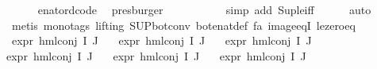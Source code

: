 \begin{isabellebody}
\ \ \ \ \isamarkupfalse%
\ enat{\isacharunderscore}{\kern0pt}ord{\isacharunderscore}{\kern0pt}code{\isacharparenleft}{\kern0pt}{}{\isacharparenright}{\kern0pt}\ \isamarkupfalse%
\ presburger\isanewline
\ \ \ \ \ \ \ \ \ \isamarkupfalse%
\ {\isacharparenleft}{\kern0pt}simp\ add{\isacharcolon}{\kern0pt}\ Sup{\isacharunderscore}{\kern0pt}le{\isacharunderscore}{\kern0pt}iff{\isacharparenright}{\kern0pt}\isanewline
\ \ \ \ \isamarkupfalse%
\ auto\isanewline
\ \ \ \ \isamarkupfalse%
\ {\isacharparenleft}{\kern0pt}metis\ {\isacharparenleft}{\kern0pt}mono{\isacharunderscore}{\kern0pt}tags{\isacharcomma}{\kern0pt}\ lifting{\isacharparenright}{\kern0pt}\ SUP{\isacharunderscore}{\kern0pt}bot{\isacharunderscore}{\kern0pt}conv{\isacharparenleft}{\kern0pt}{}{\isacharparenright}{\kern0pt}\ bot{\isacharunderscore}{\kern0pt}enat{\isacharunderscore}{\kern0pt}def\ fa{\isacharunderscore}{\kern0pt}{\isasymphi}\ image{\isacharunderscore}{\kern0pt}eqI\ le{\isacharunderscore}{\kern0pt}zero{\isacharunderscore}{\kern0pt}eq{\isacharparenright}{\kern0pt}{\isacharplus}{\kern0pt}\isanewline
\isanewline
\ \ \isamarkupfalse%
\ {\isachardoublequoteopen}expr{\isacharunderscore}{\kern0pt}{}\ {\isacharparenleft}{\kern0pt}hml{\isacharunderscore}{\kern0pt}conj\ I\ J\ {\isasymPhi}{\isacharparenright}{\kern0pt}\ {\isasymle}\ {}{\isachardoublequoteclose}\isanewline
{\isachardoublequoteopen}expr{\isacharunderscore}{\kern0pt}{}\ {\isacharparenleft}{\kern0pt}hml{\isacharunderscore}{\kern0pt}conj\ I\ J\ {\isasymPhi}{\isacharparenright}{\kern0pt}\ {\isasymle}\ {\isasyminfinity}{\isachardoublequoteclose}\isanewline
{\isachardoublequoteopen}expr{\isacharunderscore}{\kern0pt}{}\ {\isacharparenleft}{\kern0pt}hml{\isacharunderscore}{\kern0pt}conj\ I\ J\ {\isasymPhi}{\isacharparenright}{\kern0pt}\ {\isasymle}\ {}{\isachardoublequoteclose}\isanewline
{\isachardoublequoteopen}expr{\isacharunderscore}{\kern0pt}{}\ {\isacharparenleft}{\kern0pt}hml{\isacharunderscore}{\kern0pt}conj\ I\ J\ {\isasymPhi}{\isacharparenright}{\kern0pt}\ {\isasymle}\ {}{\isachardoublequoteclose}\isanewline
{\isachardoublequoteopen}expr{\isacharunderscore}{\kern0pt}{}\ {\isacharparenleft}{\kern0pt}hml{\isacharunderscore}{\kern0pt}conj\ I\ J\ {\isasymPhi}{\isacharparenright}{\kern0pt}\ {\isasymle}\ {}{\isachardoublequoteclose}\isanewline
{\isachardoublequoteopen}expr{\isacharunderscore}{\kern0pt}{}\ {\isacharparenleft}{\kern0pt}hml{\isacharunderscore}{\kern0pt}conj\ I\ J\ {\isasymPhi}{\isacharparenright}{\kern0pt}\ {\isasymle}\ {}{\isachardoublequoteclose}\isanewline

\end{isabellebody}
